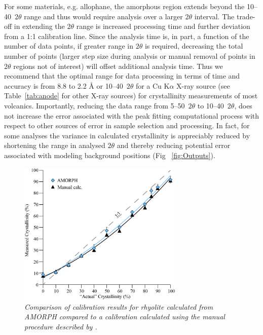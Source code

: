 \documentclass[review]{elsarticle}
\begin{document}
For some materials, e.g. allophane, the amorphous region extends beyond the 10--40\degree~$2\theta$ range and thus would require analysis over a larger $2\theta$ interval. 
The trade-off in extending the $2\theta$ range is increased processing time and further deviation from a 1:1 calibration line. Since the analysis time is, in part, a function of the number of data points, if greater range in $2\theta$ is required, decreasing the total number of points (larger step size during analysis or manual removal of points in $2\theta$ regions not of interest) will offset additional analysis time. Thus we recommend that the optimal range for data processing in terms of time and accuracy is from 8.8 to 2.2 {\AA} or 10--40\degree~$2\theta$ for a Cu K{$\alpha$} X-ray source (see Table~\ref{tab:anode} for other X-ray sources) for crystallinity measurements of most volcanics. Importantly, reducing the data range from 5--50\degree~$2\theta$ to 10--40\degree~$2\theta$, does not increase the error associated with the peak fitting computational process with respect to other sources of error in sample selection and processing. In fact, for some analyses the variance in calculated crystallinity is appreciably reduced by shortening the range in analysed $2\theta$ and thereby reducing potential error associated with modeling background positions (Fig ~\ref{fig:Outputs}).



\begin{figure}[!ht]
\centering
\includegraphics[width=0.7\textwidth]{figures/Comparison.jpg}
\caption{\it Comparison of calibration results for rhyolite calculated from AMORPH compared to a calibration calculated using the manual procedure described by \citet{rowe2012}.\label{fig:Comparison}}
\end{figure}
\end{document}
